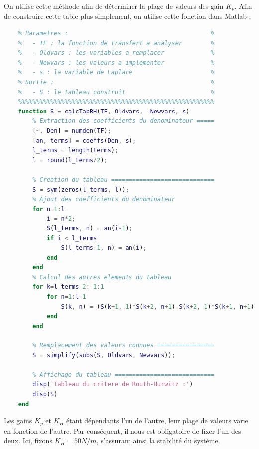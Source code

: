 \documentclass[a4paper,12pt]{article}
\begin{document}
    On utilise cette méthode afin de déterminer la plage de valeurs des gain $K_p$. Afin de construire cette table plus simplement, on utilise cette fonction dans Matlab : \\
    \begin{lstlisting}[label={code:fctCritRH}, caption={Fonction Matlab génération du critère de Routh-Hurwitz}, language=Matlab]
    %%%%%%%%%%%%%%%%%%%%%%%%%%%%%%%%%%%%%%%%%%%%%%%%%%%%%%%
    % Parametres :                                        %
    %   - TF : la fonction de transfert a analyser        %
    %   - Oldvars : les variables a remplacer             %
    %   - Newvars : les valeurs a implementer             %
    %   - s : la variable de Laplace                      %
    % Sortie :                                            %
    %   - S : le tableau construit                        %
    %%%%%%%%%%%%%%%%%%%%%%%%%%%%%%%%%%%%%%%%%%%%%%%%%%%%%%%
    function S = calcTabRH(TF, Oldvars,  Newvars, s)
        % Extraction des coefficients du denominateur =====
        [~, Den] = numden(TF);
        [an, terms] = coeffs(Den, s);
        l_terms = length(terms);
        l = round(l_terms/2);

        % Creation du tableau =============================
        S = sym(zeros(l_terms, l));
        % Ajout des coefficients du denominateur
        for n=1:l
            i = n*2;
            S(l_terms, n) = an(i-1);
            if i < l_terms
                S(l_terms-1, n) = an(i);
            end
        end
        % Calcul des autres elements du tableau
        for k=l_terms-2:-1:1
            for n=1:l-1
                S(k, n) = (S(k+1, 1)*S(k+2, n+1)-S(k+2, 1)*S(k+1, n+1))/S(k+1, 1);
            end
        end

        % Remplacement des valeurs connues ================
        S = simplify(subs(S, Oldvars, Newvars));

        % Affichage du tableau ============================
        disp('Tableau du critere de Routh-Hurwitz :')
        disp(S)
    end
    \end{lstlisting}

    Les gains $K_p$ et $K_H$ étant dépendants l'un de l'autre, leur plage de valeurs varie en fonction de l'autre. Par conséquent, il nous est obligatoire de fixer l'un des deux. Ici, fixons $K_H = 50 N/m$, s'assurant ainsi la stabilité du système.
    
\end{document}
